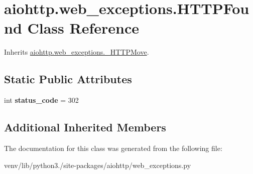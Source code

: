 \hypertarget{classaiohttp_1_1web__exceptions_1_1_h_t_t_p_found}{}\section{aiohttp.\+web\+\_\+exceptions.\+H\+T\+T\+P\+Found Class Reference}
\label{classaiohttp_1_1web__exceptions_1_1_h_t_t_p_found}


Inherits \hyperlink{classaiohttp_1_1web__exceptions_1_1___h_t_t_p_move}{aiohttp.\+web\+\_\+exceptions.\+\_\+\+H\+T\+T\+P\+Move}.

\subsection*{Static Public Attributes}
\begin{DoxyCompactItemize}
\item 
\mbox{\label{classaiohttp_1_1web__exceptions_1_1_h_t_t_p_found_a5006c9196ac5c9ac0d8eb6a05ca3464c}} 
int {\bfseries status\+\_\+code} = 302
\end{DoxyCompactItemize}
\subsection*{Additional Inherited Members}


The documentation for this class was generated from the following file\+:\begin{DoxyCompactItemize}
\item 
venv/lib/python3./site-\/packages/aiohttp/web\+\_\+exceptions.\+py\end{DoxyCompactItemize}
